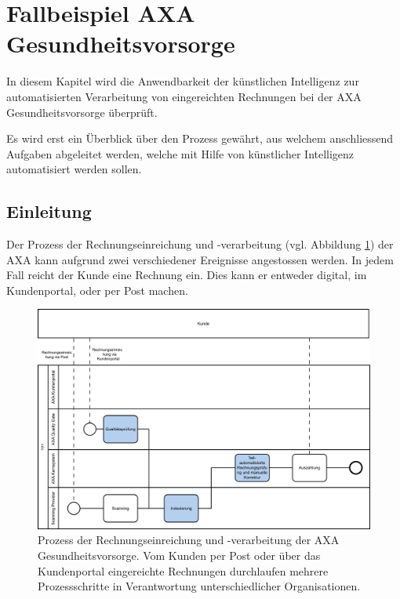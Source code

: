\section{Fallbeispiel AXA Gesundheitsvorsorge}

In diesem Kapitel wird die Anwendbarkeit der künstlichen Intelligenz zur automatisierten Verarbeitung von eingereichten Rechnungen bei der AXA Gesundheitsvorsorge überprüft.

Es wird erst ein Überblick über den Prozess gewährt, aus welchem anschliessend Aufgaben abgeleitet werden, welche mit Hilfe von künstlicher Intelligenz automatisiert werden sollen.

\subsection{Einleitung}


Der Prozess der Rechnungseinreichung und -verarbeitung (vgl. Abbildung \ref{prozessaxa}) der AXA kann aufgrund zwei verschiedener Ereignisse angestossen werden. In jedem Fall reicht der Kunde eine Rechnung ein. Dies kann er entweder digital, im Kundenportal, oder per Post machen. 

\begin{figure}[h]
    \captionsetup{width=.8\linewidth}
    \caption{Prozess der Rechnungseinreichung und -verarbeitung der AXA Gesundheitsvorsorge. Vom Kunden per Post oder über das Kundenportal eingereichte Rechnungen durchlaufen mehrere Prozessschritte in Verantwortung unterschiedlicher Organisationen.}
    \label{prozessaxa}
    \centering
    \vspace{0.2cm}
    \includegraphics[width=\textwidth]{graphics/rechnungseinreichung-bpmn.png}
\end{figure}

